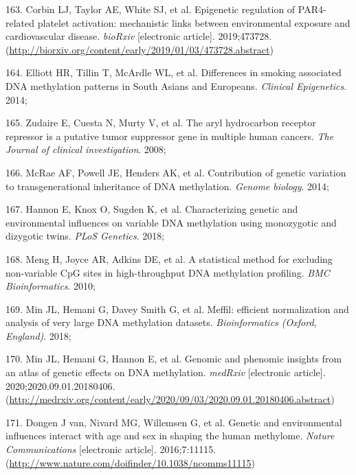 \documentclass[11pt,twoside]{bristolthesis}
\newenvironment{cslreferences}%
  {}%
  {\par}
\begin{document}
\begin{cslreferences}
\leavevmode\hypertarget{ref-Corbin2019}{}%
163. Corbin LJ, Taylor AE, White SJ, et al. Epigenetic regulation of PAR4-related platelet activation: mechanistic links between environmental exposure and cardiovascular disease. \emph{bioRxiv} {[}electronic article{]}. 2019;473728. (\url{http://biorxiv.org/content/early/2019/01/03/473728.abstract})

\leavevmode\hypertarget{ref-Elliott2014}{}%
164. Elliott HR, Tillin T, McArdle WL, et al. Differences in smoking associated DNA methylation patterns in South Asians and Europeans. \emph{Clinical Epigenetics}. 2014;

\leavevmode\hypertarget{ref-Zudaire2008}{}%
165. Zudaire E, Cuesta N, Murty V, et al. The aryl hydrocarbon receptor repressor is a putative tumor suppressor gene in multiple human cancers. \emph{The Journal of clinical investigation}. 2008;

\leavevmode\hypertarget{ref-McRae2014}{}%
166. McRae AF, Powell JE, Henders AK, et al. Contribution of genetic variation to transgenerational inheritance of DNA methylation. \emph{Genome biology}. 2014;

\leavevmode\hypertarget{ref-Hannon2018}{}%
167. Hannon E, Knox O, Sugden K, et al. Characterizing genetic and environmental influences on variable DNA methylation using monozygotic and dizygotic twins. \emph{PLoS Genetics}. 2018;

\leavevmode\hypertarget{ref-Meng2010}{}%
168. Meng H, Joyce AR, Adkins DE, et al. A statistical method for excluding non-variable CpG sites in high-throughput DNA methylation profiling. \emph{BMC Bioinformatics}. 2010;

\leavevmode\hypertarget{ref-Min2018}{}%
169. Min JL, Hemani G, Davey Smith G, et al. Meffil: efficient normalization and analysis of very large DNA methylation datasets. \emph{Bioinformatics (Oxford, England)}. 2018;

\leavevmode\hypertarget{ref-Min2020}{}%
170. Min JL, Hemani G, Hannon E, et al. Genomic and phenomic insights from an atlas of genetic effects on DNA methylation. \emph{medRxiv} {[}electronic article{]}. 2020;2020.09.01.20180406. (\url{http://medrxiv.org/content/early/2020/09/03/2020.09.01.20180406.abstract})

\leavevmode\hypertarget{ref-VanDongen2016}{}%
171. Dongen J van, Nivard MG, Willemsen G, et al. Genetic and environmental influences interact with age and sex in shaping the human methylome. \emph{Nature Communications} {[}electronic article{]}. 2016;7:11115. (\url{http://www.nature.com/doifinder/10.1038/ncomms11115})


\end{cslreferences}
\end{document}
